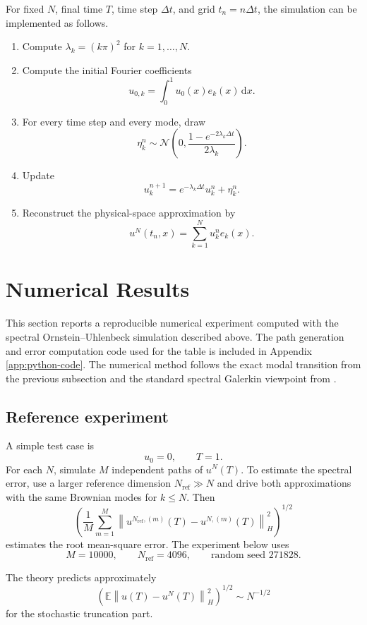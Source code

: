 \documentclass[11pt,a4paper]{article}
\newcommand{\E}{\mathbb{E}}
\newcommand{\dd}{\,\mathrm{d}}
\newcommand{\norm}[1]{\left\lVert #1 \right\rVert}
\begin{document}
For fixed \(N\), final time \(T\), time step \(\Delta t\), and grid
\(t_n=n\Delta t\), the simulation can be implemented as follows.

\begin{enumerate}
  \item Compute \(\lambda_k=(k\pi)^2\) for \(k=1,\dots,N\).
  \item Compute the initial Fourier coefficients
  \[
    u_{0,k}=\int_0^1 u_0(x)e_k(x)\dd x.
  \]
  \item For every time step and every mode, draw
  \[
    \eta_k^n\sim
    \mathcal N\left(0,\frac{1-e^{-2\lambda_k\Delta t}}{2\lambda_k}\right).
  \]
  \item Update
  \[
    u_k^{n+1}=e^{-\lambda_k\Delta t}u_k^n+\eta_k^n.
  \]
  \item Reconstruct the physical-space approximation by
  \[
    u^N(t_n,x)=\sum_{k=1}^{N}u_k^n e_k(x).
  \]
\end{enumerate}

\section{Numerical Results}

This section reports a reproducible numerical experiment computed with the
spectral Ornstein--Uhlenbeck simulation described above. The path generation and
error computation code used for the table is included in Appendix
\ref{app:python-code}. The numerical method follows the exact modal transition
from the previous subsection and the standard spectral Galerkin viewpoint from
\cite{lordPowellShardlow}.

\subsection{Reference experiment}

A simple test case is
\[
  u_0=0,\qquad T=1.
\]
For each \(N\), simulate \(M\) independent paths of \(u^N(T)\). To estimate the
spectral error, use a larger reference dimension \(N_{\mathrm{ref}}\gg N\) and
drive both approximations with the same Brownian modes for \(k\le N\). Then
\[
  \left(
    \frac1M\sum_{m=1}^{M}
    \norm{u^{N_{\mathrm{ref}},(m)}(T)-u^{N,(m)}(T)}_H^2
  \right)^{1/2}
\]
estimates the root mean-square error. The experiment below uses
\[
  M=10000,\qquad N_{\mathrm{ref}}=4096,
  \qquad \text{random seed }271828.
\]

The theory predicts approximately
\[
  \left(\E\norm{u(T)-u^N(T)}_H^2\right)^{1/2}
  \sim N^{-1/2}
\]
for the stochastic truncation part.
\end{document}

